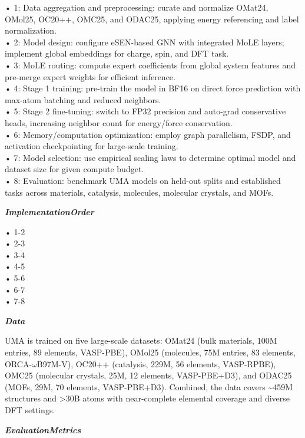 \begin{tcolorbox}[
    breakable,
    title={Example of Idea Generation in Physics},
    colback=LighterGray,
    colframe=DeepPurple,
    colbacktitle=DeepPurple,
    coltitle=White,
]
• 1: Data aggregation and preprocessing: curate and normalize OMat24, OMol25, OC20++, OMC25, and ODAC25, applying energy referencing and label normalization. \\
• 2: Model design: configure eSEN-based GNN with integrated MoLE layers; implement global embeddings for charge, spin, and DFT task. \\
• 3: MoLE routing: compute expert coefficients from global system features and pre-merge expert weights for efficient inference. \\
• 4: Stage 1 training: pre-train the model in BF16 on direct force prediction with max-atom batching and reduced neighbors. \\
• 5: Stage 2 fine-tuning: switch to FP32 precision and auto-grad conservative heads, increasing neighbor count for energy/force conservation. \\
• 6: Memory/computation optimization: employ graph parallelism, FSDP, and activation checkpointing for large-scale training. \\
• 7: Model selection: use empirical scaling laws to determine optimal model and dataset size for given compute budget. \\
• 8: Evaluation: benchmark UMA models on held-out splits and established tasks across materials, catalysis, molecules, molecular crystals, and MOFs. 

\textbf{\emph{\textcolor{CaseOrange}{ImplementationOrder}}}

• 1-2 \\
• 2-3 \\
• 3-4 \\
• 4-5 \\
• 5-6 \\
• 6-7 \\
• 7-8 

\textbf{\emph{\textcolor{CaseOrange}{Data}}}

UMA is trained on five large-scale datasets: OMat24 (bulk materials, 100M entries, 89 elements,
VASP-PBE), OMol25 (molecules, 75M entries, 83 elements, ORCA-$\omega$B97M-V), OC20++ (catalysis, 229M, 56
elements, VASP-RPBE), OMC25 (molecular crystals, 25M, 12 elements, VASP-PBE+D3), and ODAC25 (MOFs,
29M, 70 elements, VASP-PBE+D3). Combined, the data covers \~{}459M structures and >30B atoms with
near-complete elemental coverage and diverse DFT settings.

\textbf{\emph{\textcolor{CaseOrange}{EvaluationMetrics}}}


\end{tcolorbox}
